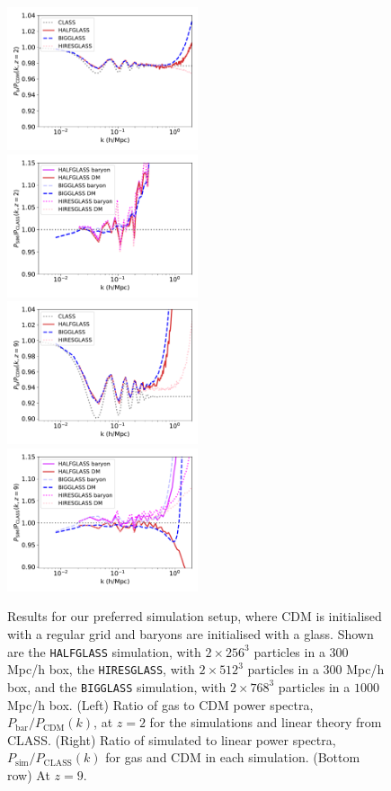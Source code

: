 \documentclass[a4paper,11pt]{article}
\begin{document}
\begin{figure}
\includegraphics[width=0.5\textwidth]{plots/halfglass_2_relpower.pdf}
  \includegraphics[width=0.5\textwidth]{plots/halfglass_2_class.pdf}
\includegraphics[width=0.5\textwidth]{plots/halfglass_9_relpower.pdf}
\includegraphics[width=0.5\textwidth]{plots/halfglass_9_class.pdf}
\caption{Results for our preferred simulation setup, where CDM is initialised with a regular grid and baryons are initialised with a glass. Shown are the \texttt{HALFGLASS} simulation, with $2\times 256^3$ particles in a $300$ Mpc/h box, the \texttt{HIRESGLASS}, with $2\times 512^3$ particles in a $300$ Mpc/h box, and the \texttt{BIGGLASS} simulation, with $2\times 768^3$ particles in a $1000$ Mpc/h box. (Left) Ratio of gas to CDM power spectra, $P_\mathrm{bar}/P_\mathrm{CDM}(k)$, at $z=2$ for the simulations and linear theory from CLASS. (Right) Ratio of simulated to linear power spectra, $P_\mathrm{sim}/P_\mathrm{CLASS}(k)$ for gas and CDM in each simulation. (Bottom row) At $z=9$.}
  \label{fig:baryonglass}
\end{figure}
\end{document}

